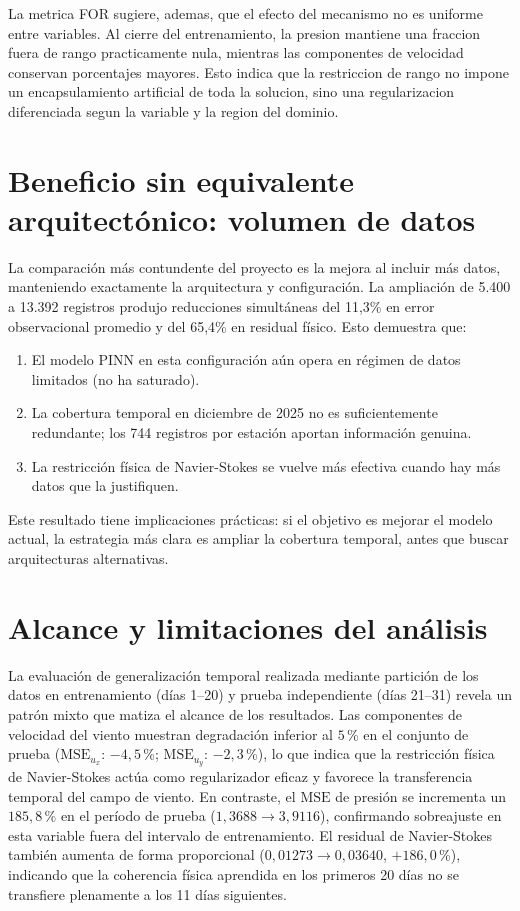 La metrica FOR sugiere, ademas, que el efecto del mecanismo no es uniforme entre variables. Al cierre del entrenamiento, la presion mantiene una fraccion fuera de rango practicamente nula, mientras las componentes de velocidad conservan porcentajes mayores. Esto indica que la restriccion de rango no impone un encapsulamiento artificial de toda la solucion, sino una regularizacion diferenciada segun la variable y la region del dominio.

\section{Beneficio sin equivalente arquitectónico: volumen de datos}

La comparación más contundente del proyecto es la mejora al incluir más datos, manteniendo exactamente la arquitectura y configuración. La ampliación de 5.400 a 13.392 registros produjo reducciones simultáneas del 11,3\% en error observacional promedio y del 65,4\% en residual físico. Esto demuestra que:

\begin{enumerate}
	\item El modelo PINN en esta configuración aún opera en régimen de datos limitados (no ha saturado).
	\item La cobertura temporal en diciembre de 2025 no es suficientemente redundante; los 744 registros por estación aportan información genuina.
	\item La restricción física de Navier-Stokes se vuelve más efectiva cuando hay más datos que la justifiquen.
\end{enumerate}

Este resultado tiene implicaciones prácticas: si el objetivo es mejorar el modelo actual, la estrategia más clara es ampliar la cobertura temporal, antes que buscar arquitecturas alternativas.

\section{Alcance y limitaciones del análisis}

La evaluación de generalización temporal realizada mediante partición de los datos en
entrenamiento (días 1–20) y prueba independiente (días 21–31) revela un patrón mixto que
matiza el alcance de los resultados. Las componentes de velocidad del viento muestran
degradación inferior al $5$\,\% en el conjunto de prueba ($\text{MSE}_{u_x}$: $-4{,}5$\,\%;
$\text{MSE}_{u_y}$: $-2{,}3$\,\%), lo que indica que la restricción física de Navier-Stokes
actúa como regularizador eficaz y favorece la transferencia temporal del campo de viento.
En contraste, el $\text{MSE}$ de presión se incrementa un $185{,}8$\,\% en el período de prueba
($1{,}3688 \to 3{,}9116$), confirmando sobreajuste en esta variable fuera del intervalo de
entrenamiento. El residual de Navier-Stokes también aumenta de forma proporcional
($0{,}01273 \to 0{,}03640$, $+186{,}0$\,\%), indicando que la coherencia física aprendida en
los primeros 20 días no se transfiere plenamente a los 11 días siguientes.

